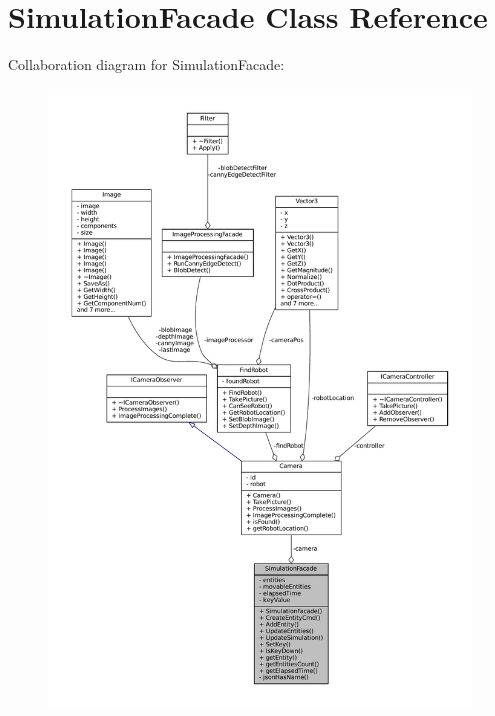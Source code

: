 \hypertarget{classSimulationFacade}{}\section{Simulation\+Facade Class Reference}
\label{classSimulationFacade}


Collaboration diagram for Simulation\+Facade\+:\nopagebreak
\begin{figure}[H]
\begin{center}
\leavevmode
\includegraphics[width=350pt]{classSimulationFacade__coll__graph}
\end{center}
\end{figure}
